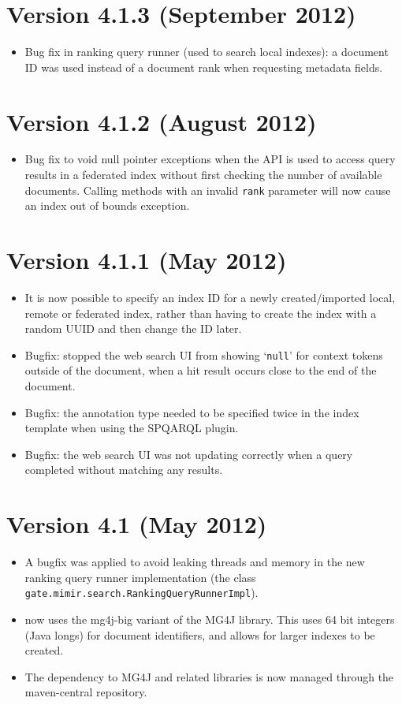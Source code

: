 \section{Version 4.1.3 (September 2012)}
\begin{itemize}
  \item Bug fix in ranking query runner (used to search local indexes): a 
  document ID was used instead of a document rank when requesting metadata 
  fields.
\end{itemize}
\section{Version 4.1.2 (August 2012)}
\begin{itemize}
  \item Bug fix to void null pointer exceptions when the API is used to access
  query results in a federated index without first checking the number of
  available documents. Calling methods with an invalid {\tt rank} parameter will
  now cause an index out of bounds exception.
\end{itemize}
\section{Version 4.1.1 (May 2012)}
\begin{itemize}
\item It is now possible to specify an index ID for a newly created/imported
  local, remote or federated index, rather than having to create the index with
  a random UUID and then change the ID later.
\item Bugfix: stopped the web search UI from showing `{\tt null}' for context
  tokens outside of the document, when a hit result occurs close to the end of
  the document.
\item Bugfix: the annotation type needed to be specified twice in the index
  template when using the SPQARQL plugin.
\item Bugfix: the web search UI was not updating correctly when a query
  completed without matching any results.   
\end{itemize}

\section{Version 4.1 (May 2012)}
\begin{itemize}
\item A bugfix was applied to avoid leaking threads and memory in the new
  ranking query runner implementation (the class {\tt gate.mimir.search.RankingQueryRunnerImpl}).
\item \Mimir{} now uses the mg4j-big variant of the MG4J library. This uses
  64 bit integers (Java longs) for document identifiers, and allows for larger
  indexes to be created.
\item The dependency to MG4J and related libraries is now managed through the
  maven-central repository.
\end{itemize}


